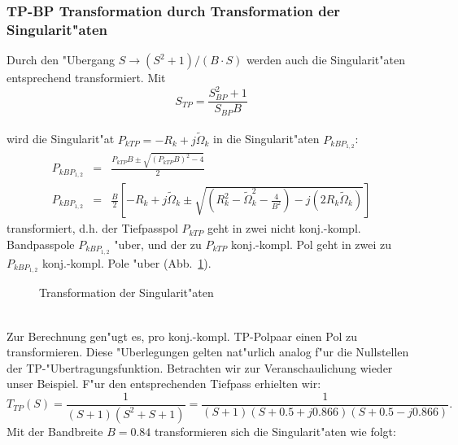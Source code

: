 \subsubsection{TP-BP Transformation durch Transformation der Singularit"aten}
Durch den "Ubergang $S\longrightarrow (S^2+1)/(B\cdot S)$ werden auch die Singularit"aten entsprechend
transformiert. Mit
\begin{equation*}
        S_{TP}=\frac{S^{2}_{BP}+1}{S_{BP}B}
\end{equation*}\\  
\nit wird die Singularit"at $P_{kTP}=-R_{k} + j
\tilde{\Omega}_{k}$ in die Singularit"aten $P_{kBP_{1,2}}$:
\begin{eqnarray}
        P_{kBP_{1,2}} &=& \frac{P_{kTP}B \pm \sqrt{(P_{kTP}B)^{2}-4}}{2}\\
        P_{kBP_{1,2}} &=& \frac{B}{2} \left[-R_{k}+j\tilde{\Omega}_{k} \pm 
        \sqrt{\left(R^{2}_{k}-\tilde{\Omega}^{2}_{k}-\frac{4}{B^{2}}\right)-
        j(2R_{k}\tilde{\Omega}_{k})}\right]
\end{eqnarray}
transformiert, d.h. der Tiefpasspol $P_{kTP}$ geht in zwei nicht konj.-kompl.
Bandpasspole $P_{kBP_{1,2}}$  "uber, und der zu $P_{kTP}$  konj.-kompl. Pol geht in zwei zu
$P_{kBP_{1,2}}$ konj.-kompl. Pole "uber (Abb.~\ref{transs-tp-bp}).
\begin{figure}[!htb]
\vspace*{-3mm}
\begin{center}
  \caption{Transformation der Singularit"aten \label{transs-tp-bp}}
\end{center}
\vspace*{-6mm}
\end{figure}\\
\nit Zur Berechnung gen"ugt es, pro konj.-kompl. TP-Polpaar einen Pol
zu transformieren.  Diese "Uberlegungen gelten nat"urlich analog f"ur
die Nullstellen der TP-"Uber\-tragungs\-funktion. Betrachten wir zur
Veranschaulichung wieder unser Beispiel. F"ur den entsprechenden
Tiefpass erhielten wir:
\[
T_{TP}(S)=\frac{1}{(S+1)(S^{2}+S+1)}=\frac{1}{(S+1)(S+0.5+j0.866)(S+0.5-j0.866)}.
\]
Mit der Bandbreite $B=0.84$ transformieren sich die Singularit"aten wie
folgt:

